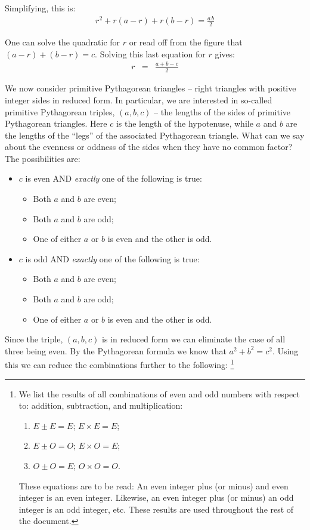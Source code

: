 \documentclass[12pt]{article}
\begin{document}
Simplifying, this is:
\begin{eqnarray}
r^2 + r(a - r) + r(b-r) = \frac{a\, b}{2} \label{area} 
\end{eqnarray}

One can solve the quadratic for $r$ or read off from the figure 
that $(a-r) + (b-r) = c$. Solving this last equation for $r$ gives:
\begin{eqnarray}
  r & = & \frac{a + b - c}{2} \label{radius}
\end{eqnarray}

We now consider primitive Pythagorean triangles -- right 
triangles with positive integer sides in reduced form.
In particular, we are interested in so-called primitive Pythagorean triples,
$(a,b,c)$ -- the lengths of the sides of primitive Pythagorean triangles.
Here $c$ is the length of the hypotenuse, while $a$ and $b$ are 
the lengths of the ``legs'' of the associated Pythagorean triangle.
\eject
What can we say about the evenness or oddness of the sides when they have no 
common factor? The possibilities are: 
\begin{itemize}
    \item{$c$ is even AND {\em exactly\/} one of the following is true:}
        \begin{itemize}
            \item{Both $a$ and $b$ are even;}
            \item{Both $a$ and $b$ are odd;}
            \item{One of either $a$ or $b$ is even and the other is odd.}
        \end{itemize}
    \item{$c$ is odd AND {\em exactly\/} one of the following is true:}
        \begin{itemize}
            \item{Both $a$ and $b$ are even;}
            \item{Both $a$ and $b$ are odd;}
            \item{One of either $a$ or $b$ is even and the other is odd.}
        \end{itemize}
\end{itemize}
Since the triple, $(a,b,c)$ is in reduced form we can eliminate the case 
of all three being even.
By the Pythagorean formula we know that $a^2 + b^2 = c^2$. Using this we can 
reduce the combinations further to the following:%
\footnote{We list the results of all combinations of even and odd numbers with 
respect to: addition, subtraction, and multiplication:
\begin{enumerate}
    \item{$E \pm E = E$; $ E \times E = E$;}
    \item{$E \pm O = O$; $ E \times O = E$;}
    \item{$O \pm O = E$; $ O \times O = O$.}
\end{enumerate}
These equations are to be read: An even integer plus (or minus) and even integer 
is an even integer.
Likewise, an even integer plus (or minus) an odd integer is an odd integer, etc.
These results are used throughout the rest of the document.
}
\end{document}
